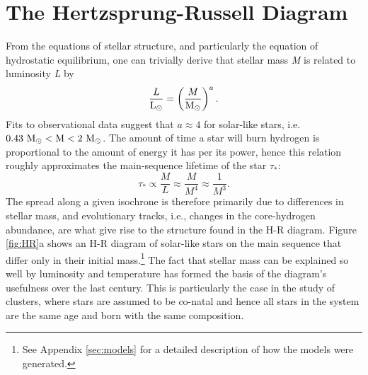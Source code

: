 \documentclass[a4paper,fleqn,usenatbib,useAMS]{mnras}
\newcommand{\Mo}{\rm{M}_\odot}
\newcommand{\Lo}{\rm{L}_\odot}
\begin{document}
\section{The Hertzsprung-Russell Diagram}
From the equations of stellar structure, and particularly the equation of hydrostatic equilibrium, one can trivially derive that stellar mass \textit{M} is related to luminosity \textit{L} by
\begin{equation} \label{eqn:ml1}
  \frac{L}{\Lo} = \left(\frac{M}{\Mo}\right)^a.
\end{equation}
Fits to observational data suggest that $a\approx 4$ for solar-like stars, i.e.~$0.43 \ \Mo < M < 2 \ \Mo$. The amount of time a star will burn hydrogen is proportional to the amount of energy it has per its power,  hence this relation roughly approximates the main-sequence lifetime of the star $\tau_*$: 
\begin{equation}
  \tau_* \propto \frac{M}{L} \approx \frac{M}{M^4} \approx \frac{1}{M^3}.
\end{equation}
The spread along a given isochrone is therefore primarily due to differences in stellar mass, and evolutionary tracks, i.e., changes in the core-hydrogen abundance, are what give rise to the structure found in the H-R diagram. Figure \ref{fig:HR}a shows an H-R diagram of solar-like stars on the main sequence that differ only in their initial mass.\footnote{See Appendix \ref{sec:models} for a detailed description of how the models were generated.} The fact that stellar mass can be explained so well by luminosity and temperature has formed the basis of the diagram's usefulness over the last century. This is particularly the case in the study of clusters, where stars are assumed to be co-natal and hence all stars in the system are the same age and born with the same composition. %
\end{document}
